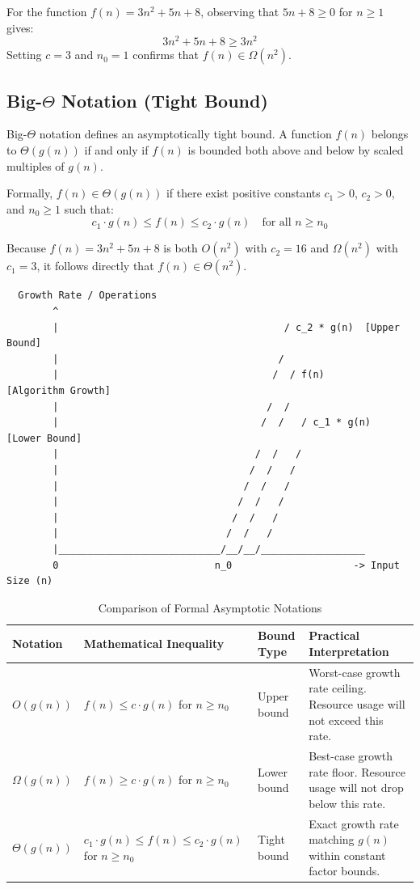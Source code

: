 \documentclass[12pt]{report}
\begin{document}
For the function $f(n) = 3n^2 + 5n + 8$, observing that $5n + 8 \ge 0$ for $n \ge 1$ gives:
\[
3n^2 + 5n + 8 \ge 3n^2
\]
Setting $c = 3$ and $n_0 = 1$ confirms that $f(n) \in \Omega(n^2)$.

\subsection{Big-$\Theta$ Notation (Tight Bound)}

Big-$\Theta$ notation defines an asymptotically tight bound. A function $f(n)$ belongs to $\Theta(g(n))$ if and only if $f(n)$ is bounded both above and below by scaled multiples of $g(n)$.

Formally, $f(n) \in \Theta(g(n))$ if there exist positive constants $c_1 > 0$, $c_2 > 0$, and $n_0 \ge 1$ such that:
\[
c_1 \cdot g(n) \le f(n) \le c_2 \cdot g(n) \quad \text{for all } n \ge n_0
\]

Because $f(n) = 3n^2 + 5n + 8$ is both $O(n^2)$ with $c_2 = 16$ and $\Omega(n^2)$ with $c_1 = 3$, it follows directly that $f(n) \in \Theta(n^2)$.

\begin{verbatim}
  Growth Rate / Operations
        ^
        |                                       / c_2 * g(n)  [Upper Bound]
        |                                      /
        |                                     /  / f(n)        [Algorithm Growth]
        |                                    /  /
        |                                   /  /   / c_1 * g(n)  [Lower Bound]
        |                                  /  /   /
        |                                 /  /   /
        |                                /  /   /
        |                               /  /   /
        |                              /  /   /
        |                             /  /   /
        |____________________________/__/__/__________________
        0                           n_0                     -> Input Size (n)
\end{verbatim}

\begin{table}[htbp]
\centering
\caption{Comparison of Formal Asymptotic Notations}
\label{tab:asymptotic_notations}
\begin{tabularx}{\textwidth}{>{\raggedright\arraybackslash}p{2.2cm} >{\raggedright\arraybackslash}p{4.2cm} >{\raggedright\arraybackslash}p{2.2cm} X}
\toprule
\textbf{Notation} & \textbf{Mathematical Inequality} & \textbf{Bound Type} & \textbf{Practical Interpretation} \\
\midrule
$O(g(n))$ & $f(n) \le c \cdot g(n)$ for $n \ge n_0$ & Upper bound & Worst-case growth rate ceiling. Resource usage will not exceed this rate. \\
$\Omega(g(n))$ & $f(n) \ge c \cdot g(n)$ for $n \ge n_0$ & Lower bound & Best-case growth rate floor. Resource usage will not drop below this rate. \\
$\Theta(g(n))$ & $c_1 \cdot g(n) \le f(n) \le c_2 \cdot g(n)$ for $n \ge n_0$ & Tight bound & Exact growth rate matching $g(n)$ within constant factor bounds. \\
\bottomrule
\end{tabularx}
\end{table}
\end{document}
